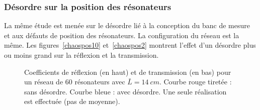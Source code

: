 \subsubsection{Désordre sur la position des résonateurs}
La même étude est menée sur le désordre lié à la conception du banc de mesure et aux défauts de position des résonateurs. La configuration du réseau est la même.
Les figures~\ref{chaospos10} et~\ref{chaospos2} montrent l'effet d'un désordre plus ou moins grand sur la réflexion et la transmission.

\begin{figure}[h!]
	\caption{Coefficients de réflexion (en haut) et de transmission (en bas) pour un réseau de 60 résonateurs avec $\bar{L}=14~cm$. Courbe rouge tiretée : sans désordre. Courbe bleue : avec désordre. Une seule réalisation est effectuée (pas de moyenne).}
\end{figure}

